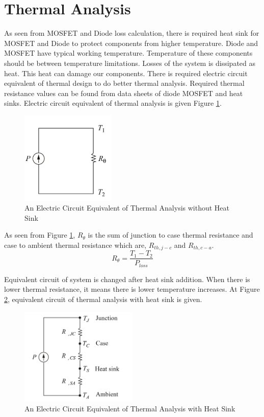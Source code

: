 \section{Thermal Analysis}

As seen from MOSFET and Diode loss calculation, there is required heat sink for MOSFET and Diode to protect components from higher temperature. Diode and MOSFET have typical working temperature. Temperature of these components should be between temperature limitations. Losses of the system is dissipated as heat. This heat can damage our components. There is required electric circuit equivalent of thermal design to do better thermal analysis. Required thermal resistance values can be found from data sheets of diode MOSFET and heat sinks. Electric circuit equivalent of thermal analysis is given Figure \ref{fig:wo-hs}.

\begin{figure}[H]
\begin{center}
\includegraphics[width=0.4\textwidth]{figures/wo-hs.PNG}
\caption{An Electric Circuit Equivalent of Thermal Analysis without Heat Sink}
\label{fig:wo-hs}
\end{center}
\end{figure}

As seen from Figure \ref{fig:wo-hs}, $R_{\theta}$ is the sum of junction to case thermal resistance and case to ambient thermal resistance which are, $R_{th,j-c}$ and $R_{th,c-a}$. 
$$R_{\theta} = \frac{T_1 - T_2 }{P_{loss}}$$

Equivalent circuit of system is changed after heat sink addition. When there is lower thermal resistance, it means there is lower temperature increases. At Figure \ref{fig:w-hs}, equivalent circuit of thermal analysis with heat sink is given. 

\begin{figure}[H]
\begin{center}
\includegraphics[width=0.5\textwidth]{figures/with hs.PNG}
\caption{An Electric Circuit Equivalent of Thermal Analysis with Heat Sink}
\label{fig:w-hs}
\end{center}
\end{figure}

